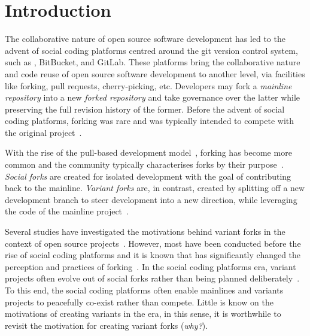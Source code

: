 \section{Introduction}
\label{sec:intro}

The collaborative nature of open source software development has led to the advent of social coding platforms centred around the git version control system, such as \gh, BitBucket, and GitLab.
These platforms bring the collaborative nature and code reuse of open source software development to another level, via facilities like forking, pull requests, cherry-picking, etc.
Developers may fork a \textit{mainline repository} into a new \textit{forked repository} and take governance over the latter while preserving the full revision history of the former.
Before the advent of social coding platforms, forking was rare and was typically intended to compete with the original project~\cite{Linus:2012Perspectives,Gregorio:2012,Viseur:2012Forks,Linus:2013CodeForking,Linus:2011ToFork,Gamalielsson:2014Sustainability}.

With the rise of the pull-based development model~\cite{Gousios:2014ICSE}, forking has become more common and the community typically characterises forks by their purpose~\cite{Zhou:2020}.
\textit{Social forks} are created for isolated development with the goal of contributing back to the mainline.
\textit{Variant forks} are, in contrast, created by splitting off a new development branch
to steer development into a new direction, while leveraging the code of the mainline project~\cite{sung:ICSE:2020}.

Several studies have investigated the motivations behind variant forks in the context of open source projects~\cite{Linus:2012Perspectives,Gregorio:2012,Viseur:2012Forks,Linus:2013CodeForking,Linus:2011ToFork,Gamalielsson:2014Sustainability}.
However, most have been conducted before the rise of social coding platforms and it is known that \gh has significantly changed the perception and practices of forking~\cite{Zhou:2020}.
In the social coding platforms era, variant projects often evolve out of social forks rather than being planned deliberately~\cite{Zhou:2020}.
To this end, the social coding platforms often enable mainlines and variants projects to peacefully co-exist rather than compete.
Little is know on the motivations of creating variants in the \gh era, in this sense, it is worthwhile
to revisit the motivation for creating variant forks (\textit{why?}).

